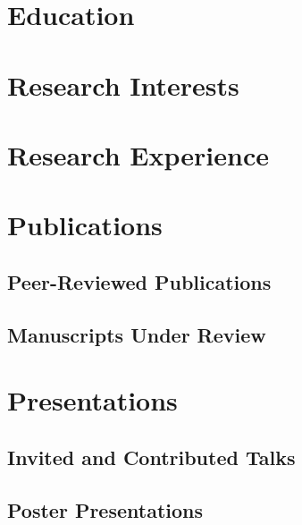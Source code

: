 \documentclass[10pt, letterpaper]{article}
\begin{document}

\cvfooter                   %
\makeheader
{}         %

\section{Education}
    \PhDDegree
    \BSDegree

\section{Research Interests}
    \ResearchInterests

\section{Research Experience}
    \ResearchPostdoc
    \ResearchPhD
    \ResearchUndergrad

\section{Publications}
    \subsection{Peer-Reviewed Publications}
    \PubReconstruction
    \PubCrossSection
    \subsection{Manuscripts Under Review}
    \PubReadout

\section{Presentations}
    \subsection{Invited and Contributed Talks}
    \TalkInvited
    \TalkConference
    \TalkSeminar
    \subsection{Poster Presentations}
    \PosterReadout
\end{document}
